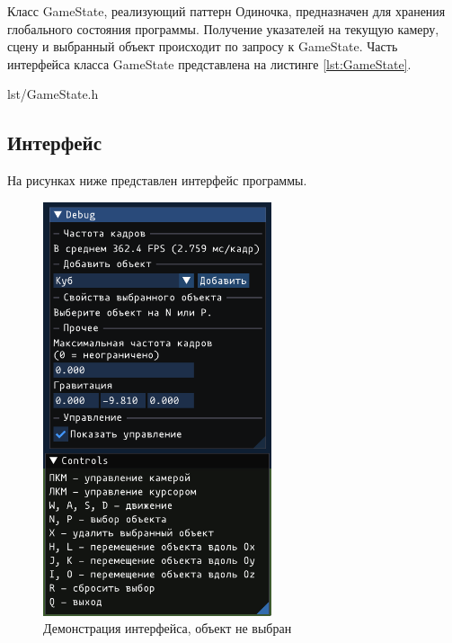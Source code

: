 Класс GameState, реализующий паттерн Одиночка, предназначен для хранения глобального состояния программы.
Получение указателей на текущую камеру, сцену и выбранный объект происходит по запросу к GameState.
Часть интерфейса класса GameState представлена на листинге \ref{lst:GameState}.

\begin{code}
    \begin{lstinputlisting}[
            label={lst:GameState},
            caption={Класс GameState},
        ]{lst/GameState.h}
    \end{lstinputlisting}
\end{code}

\subsection{Интерфейс}

На рисунках ниже представлен интерфейс программы.

\begin{figure}[H]
	\centering
	\includegraphics[width=0.6\textwidth]{img/demo-icontrols.png}
	\caption{Демонстрация интерфейса, объект не выбран}
	\label{fig:controls}
\end{figure}

